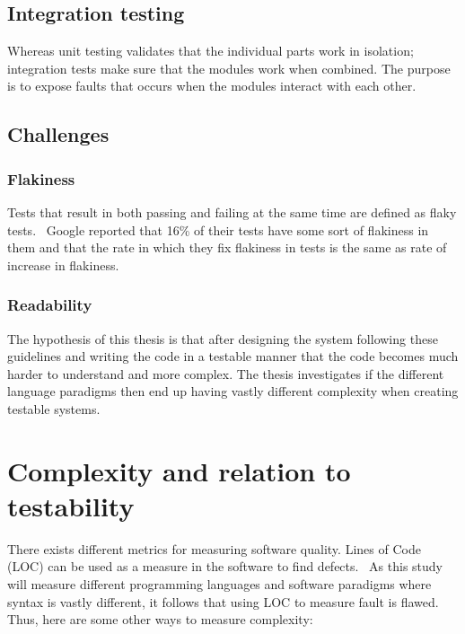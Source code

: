 \subsection{Integration testing}

Whereas unit testing validates that the individual parts work in isolation;
integration tests make sure that the modules work when combined. The purpose is
to expose faults that occurs when the modules interact with each other.

\subsection{Challenges}

\subsubsection{Flakiness}

Tests that result in both passing and failing at the same time are defined as
flaky tests.~\cite{googletests} Google reported that 16\% of their tests have
some sort of flakiness in them and that the rate in which they fix flakiness in
tests is the same as rate of increase in flakiness.

\subsubsection{Readability}

The hypothesis of this thesis is that after designing the system following these
guidelines and writing the code in a testable manner that the code becomes much
harder to understand and more complex. The thesis investigates if the different
language paradigms then end up having vastly different complexity when creating
testable systems.

\section{Complexity and relation to testability}

There exists different metrics for measuring software quality. Lines of Code
(LOC) can be used as a measure in the software to find defects.~\cite{defectloc}
As this study will measure different programming languages and software
paradigms where syntax is vastly different, it follows that using LOC to measure
fault is flawed. Thus, here are some other ways to measure complexity:

